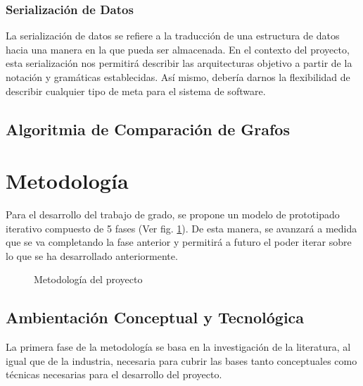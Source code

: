 \documentclass[12pt]{article}
\begin{document}
    

    \subsubsection*{Serialización de Datos}


    La serialización de datos se refiere a la traducción de una estructura de datos hacia una manera en la que pueda ser almacenada. En el contexto del proyecto, esta serialización nos permitirá describir las arquitecturas objetivo a partir de la notación y gramáticas establecidas. Así mismo, debería darnos la flexibilidad de describir cualquier tipo de meta para el sistema de software.
    

    \subsection{Algoritmia de Comparación de Grafos} %



    \pagebreak

    \section{Metodología}

    Para el desarrollo del trabajo de grado, se propone un modelo de prototipado iterativo compuesto de 5 fases (Ver fig. \ref{fig:met}). De esta manera, se avanzará a medida que se va completando la fase anterior y permitirá a futuro el poder iterar sobre lo que se ha desarrollado anteriormente.

    \begin{figure}[H]
        \centering
        
        \caption{Metodología del proyecto}
        \label{fig:met}
    \end{figure}

    \subsection{Ambientación Conceptual y Tecnológica}

    La primera fase de la metodología se basa en la investigación de la literatura, al igual que de la industria, necesaria para cubrir las bases tanto conceptuales como técnicas necesarias para el desarrollo del proyecto. 
\end{document}
